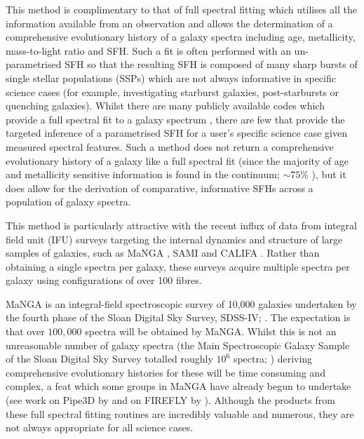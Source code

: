 \documentclass[useAMS,usenatbib]{mn2e}
\def\referee		{\color{refer}}
\begin{document}
{\referee This method is complimentary to that of full spectral fitting which utilises all the information available from an observation and allows the determination of a comprehensive evolutionary history of a galaxy spectra including age, metallicity, mass-to-light ratio and SFH. Such a fit is often performed with an un-parametrised SFH so that the resulting SFH is composed of many sharp bursts of single stellar populations (SSPs) which are not always informative in specific science cases (for example, investigating starburst galaxies, post-starbursts or quenching galaxies). Whilst there are many publicly available codes which provide a full spectral fit to a galaxy spectrum \citep[SFH;][]{cappellari04, heavens04, cidfernandes05, ocvirk06, tojeiro07, noll09, conroy14, chevallard16, wilkinson17}, there are few that provide the targeted inference of a parametrised SFH for a user's specific science case given measured spectral features. Such a method does not return a comprehensive evolutionary history of a galaxy like a full spectral fit (since the majority of age and metallicity sensitive information is found in the continuum; $\sim75\%$ \citealt{chill09, chill11}), but it does allow for the derivation of comparative, informative SFHs across a population of galaxy spectra.}


{\referee This method is particularly attractive} with the recent influx of data from integral field unit (IFU) surveys targeting the internal dynamics and structure of large samples of galaxies, such as MaNGA \protect\citep[Mapping Nearby Galaxies at Apache Point Observatory;][]{bundy15}, SAMI \protect\citep[Sydney-AAO Multi-object Integral-field spectrograph;][]{bryant12} and CALIFA \protect\citep[Calar Alto Legacy Integral Field spectroscopy Area survey;][]{sanchez12}. Rather than obtaining a single spectra per galaxy, these surveys acquire multiple spectra per galaxy using {\referee configurations} of over 100 fibres. 

MaNGA \citep{bundy15} is an integral-field spectroscopic survey of 10,000 galaxies undertaken by the fourth phase of the Sloan Digital Sky Survey, SDSS-IV; \cite{blanton17}. The expectation is that over $100,000$ spectra will be obtained by MaNGA. Whilst this is not an unreasonable number of galaxy spectra (the Main Spectroscopic Galaxy Sample of the Sloan Digital Sky Survey totalled roughly $10^6$ spectra; \citealt{strauss02}) {\referee deriving comprehensive evolutionary histories for these will be time consuming and complex, a feat which some groups in MaNGA have already begun to undertake (see work on Pipe3D by \citealt{sanchez16} and on FIREFLY by \citealt{goddard17}). Although the products from these full spectral fitting routines are incredibly valuable and numerous, they are not always appropriate for all science cases.} %
\end{document}
